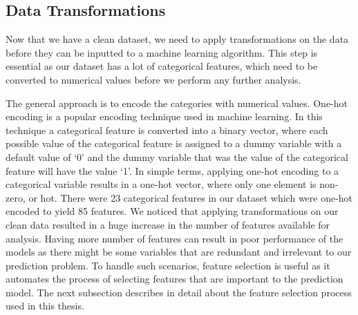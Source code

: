 \documentclass[11pt,openright]{report}
\begin{document}
\subsection {Data Transformations}
Now that we have a clean dataset, we need to apply transformations on the data before they can be inputted to a machine learning algorithm. This step is essential as our dataset has a lot of categorical features, which need to be converted to numerical values before we perform any further analysis. 

The general approach is to encode the categories with numerical values. One-hot encoding is a popular encoding technique used in machine learning. In this technique a categorical feature is converted into a binary vector, where each possible value of the categorical feature is assigned to a dummy variable with a default value of `0' and the dummy variable that was the value of the categorical feature will have the value `1'. In simple terms, applying one-hot encoding to a categorical variable results in a one-hot vector, where only one element is non-zero, or hot. There were 23 categorical features in our dataset which were one-hot encoded to yield 85 features. We noticed that applying transformations on our clean data resulted in a huge increase in the number of features available for analysis. Having more number of features can result in poor performance of the models as there might be some variables that are redundant and irrelevant to our prediction problem. To handle such scenarios, feature selection is useful as it automates the process of selecting features that are important to the prediction model. The next subsection describes in detail about the feature selection process used in this thesis.
\end{document}
